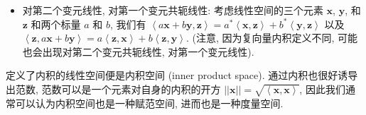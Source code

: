 \begin{itemize}

\item
  对第二个变元线性, 对第一个变元共轭线性: 考虑线性空间的三个元素
  \(\boldsymbol{x}\), \(\boldsymbol{y}\), 和 \(\boldsymbol{z}\)
  和两个标量 \(a\) 和 \(b\), 我们有
  \(\left<a\boldsymbol{x}+b\boldsymbol{y},\boldsymbol{z}\right>=a^*\left<\boldsymbol{x},\boldsymbol{z}\right>+b^*\left<\boldsymbol{y},\boldsymbol{z}\right>\)
  以及
  \(\left<\boldsymbol{z}, a\boldsymbol{x}+b\boldsymbol{y}\right>=a\left<\boldsymbol{z},\boldsymbol{x}\right>+b\left<\boldsymbol{z},\boldsymbol{y}\right>\).
  (注意, 因为复向量内积定义不同, 可能也会出现对第二个变元共轭线性,
  对第一个变元线性).
\end{itemize}

定义了内积的线性空间便是内积空间 (inner product space).
通过内积也很好诱导出范数, 范数可以是一个元素对自身的内积的开方
\(||\boldsymbol{x}||=\sqrt{\left<\boldsymbol{x},\boldsymbol{x}\right>}\),
因此我们通常可以认为内积空间也是一种赋范空间, 进而也是一种度量空间.

